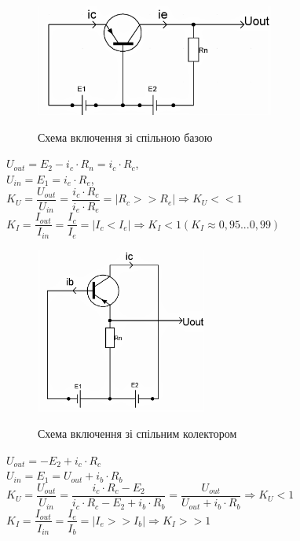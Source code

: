 \documentclass[a4paper,14pt]{extreport}
\begin{document}
\begin{figure}[!h]
\caption{Схема включення зі спільною базою}
{\includegraphics[width=0.7\textwidth]{combase}}
 \end{figure}

\begin{center}
$U_{out}=E_2-i_c\cdot{R_n}=i_c\cdot{R_c}$,\\[0.5cm]

$U_{in}=E_1=i_e\cdot{R_e}$,\\[0.5cm]

$K_U=\dfrac{U_{out}}{U_{in}}=\dfrac{i_c\cdot{R_c}}{i_e\cdot{R_e}}=\left|R_c>>R_e\right|\Rightarrow \boxed{K_U<<1}$\\[0.5cm]

$K_I=\dfrac{I_{out}}{I_{in}}=\dfrac{I_c}{I_e}=\left|I_c<I_e\right|\Rightarrow \boxed{K_I<1} (K_I\approx 0,95...0,99)$\\[0.5cm]
\end{center}
 
\newpage

\begin{figure}[!h]
\caption{Схема включення зі спільним колектором}
{\includegraphics[width=0.5\textwidth]{comcol}}
 \end{figure}

\begin{center}
$U_{out}=-E_2+i_c\cdot{R_c}$\\[0.5cm]

$U_{in}=E_1=U_{out}+i_b\cdot{R_b}$\\[0.5cm]

$K_U=\dfrac{U_{out}}{U_{in}}=\dfrac{i_c\cdot{R_c}-E_2}{i_c\cdot{R_c}-E_2+i_b\cdot{R_b}}=\dfrac{U_{out}}{U_{out}+i_b\cdot{R_b}}\Rightarrow\boxed{K_U<1}$\\[0.5cm]

$K_I=\dfrac{I_{out}}{I_{in}}=\dfrac{I_e}{I_b}=\left|I_e>>I_b\right|\Rightarrow\boxed{K_I>>1}$
\end{center}
 
\end{document}
